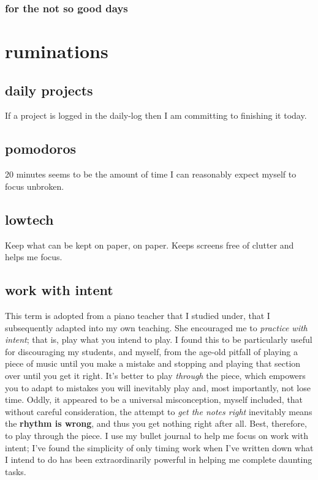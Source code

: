 \documentclass[]{book}
\begin{document}
\hypertarget{for-the-not-so-good-days}{%
\subsection{for the not so good days}\label{for-the-not-so-good-days}}

\hypertarget{ruminations}{%
\chapter{ruminations}\label{ruminations}}

\hypertarget{daily-projects}{%
\section{daily projects}\label{daily-projects}}

If a project is logged in the \protect\hypertarget{daily-log}{}{daily-log} then I am committing to finishing it today.

\hypertarget{pomodoros}{%
\section{pomodoros}\label{pomodoros}}

20 minutes seems to be the amount of time I can reasonably expect myself to focus unbroken.

\hypertarget{lowtech}{%
\section{lowtech}\label{lowtech}}

Keep what can be kept on paper, on paper. Keeps screens free of clutter and helps me focus.

\hypertarget{work-with-intent}{%
\section{work with intent}\label{work-with-intent}}

This term is adopted from a piano teacher that I studied under, that I subsequently adapted into my own teaching. She encouraged me to \emph{practice with intent}; that is, play what you intend to play. I found this to be particularly useful for discouraging my students, and myself, from the age-old pitfall of playing a piece of music until you make a mistake and stopping and playing that section over until you get it right. It's better to play \emph{through} the piece, which empowers you to adapt to mistakes you will inevitably play and, most importantly, not lose time. Oddly, it appeared to be a universal misconception, myself included, that without careful consideration, the attempt to \emph{get the notes right} inevitably means the \textbf{rhythm is wrong}, and thus you get nothing right after all. Best, therefore, to play through the piece. I use my bullet journal to help me focus on work with intent; I've found the simplicity of only timing work when I've written down what I intend to do has been extraordinarily powerful in helping me complete daunting tasks.
\end{document}
